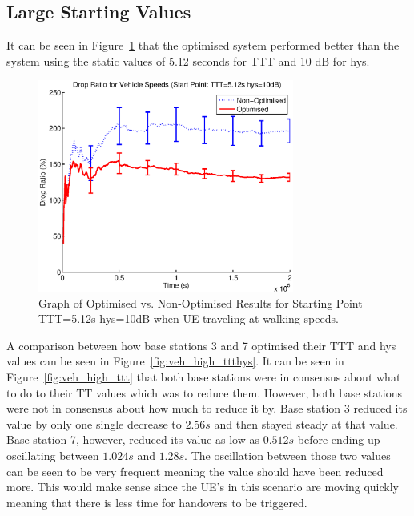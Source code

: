 \subsection{Large Starting Values}
It can be seen in Figure~\ref{fig:veh_high_drop} that the optimised system performed better than the system using the static values of 5.12 seconds for TTT and 10 dB for hys. 
\begin{figure}[H]
  \begin{center}
    	  \includegraphics[width=0.75\textwidth]{figures/vehicle_figures/vehhigh.eps}
    \end{center}
    \caption{Graph of Optimised vs. Non-Optimised Results for Starting Point TTT=5.12s hys=10dB when UE traveling at walking speeds.}
    \label{fig:veh_high_drop}
\end{figure}
A comparison between how base stations 3 and 7 optimised their TTT and hys values can be seen in Figure~\ref{fig:veh_high_ttthys}. It can be seen in Figure~\ref{fig:veh_high_ttt} that both base stations were in consensus about what to do to their TT values which was to reduce them. However, both base stations were not in consensus about how much to reduce it by. Base station 3 reduced its value by only one single decrease to $2.56 s$ and then stayed steady at that value. Base station 7, however, reduced its value as low as $0.512 s$ before ending up oscillating between $1.024 s$ and $1.28 s$. The oscillation between those two values can be seen to be very frequent meaning the value should have been reduced more. This would make sense since the UE’s in this scenario are moving quickly meaning that there is less time for handovers to be triggered.

